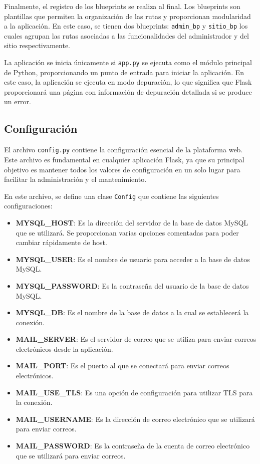 \documentclass[a4paper, 12pt]{book}
\begin{document}
Finalmente, el registro de los blueprints se realiza al final. Los blueprints son plantillas que permiten la organización de las rutas y proporcionan modularidad a la 
aplicación. En este caso, se tienen dos blueprints: \texttt{admin\_bp} y \texttt{sitio\_bp} los cuales agrupan las rutas asociadas a las funcionalidades del administrador 
y del sitio respectivamente.

La aplicación se inicia únicamente si \texttt{app.py} se ejecuta como el módulo principal de Python, proporcionando un punto de entrada para iniciar la aplicación. 
En este caso, la aplicación se ejecuta en modo depuración, lo que significa que Flask proporcionará una página con información de depuración detallada si se produce un error.

\subsection{Configuración}
\label{subsec:configuración}

El archivo \texttt{config.py} contiene la configuración esencial de la plataforma web. Este archivo es fundamental en cualquier aplicación Flask, ya que su principal objetivo 
es mantener todos los valores de configuración en un solo lugar para facilitar la administración y el mantenimiento.

En este archivo, se define una clase \texttt{Config} que contiene las siguientes configuraciones:

\begin{itemize}
    \item \textbf{MYSQL\_HOST}: Es la dirección del servidor de la base de datos MySQL que se utilizará. Se proporcionan varias opciones comentadas para poder cambiar rápidamente de host.
    \item \textbf{MYSQL\_USER}: Es el nombre de usuario para acceder a la base de datos MySQL.
    \item \textbf{MYSQL\_PASSWORD}: Es la contraseña del usuario de la base de datos MySQL.
    \item \textbf{MYSQL\_DB}: Es el nombre de la base de datos a la cual se establecerá la conexión.
    \item \textbf{MAIL\_SERVER}: Es el servidor de correo que se utiliza para enviar correos electrónicos desde la aplicación.
    \item \textbf{MAIL\_PORT}: Es el puerto al que se conectará para enviar correos electrónicos.
    \item \textbf{MAIL\_USE\_TLS}: Es una opción de configuración para utilizar TLS para la conexión.
    \item \textbf{MAIL\_USERNAME}: Es la dirección de correo electrónico que se utilizará para enviar correos.
    \item \textbf{MAIL\_PASSWORD}: Es la contraseña de la cuenta de correo electrónico que se utilizará para enviar correos.
\end{itemize}
\end{document}
